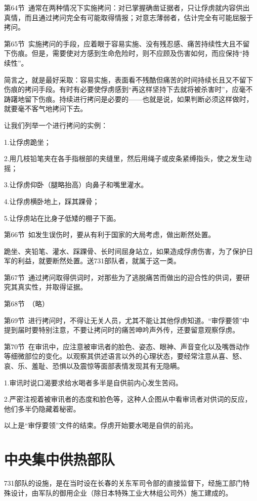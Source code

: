 \documentclass[a4paper,12pt,UTF8,twoside]{ctexbook}
\begin{document}
第64节\ 通常在两种情况下实施拷问：对已掌握确凿证据者，只让俘虏就内容供出真情，而且通过拷问完全有可能取得情报；对意志薄弱者，估计完全有可能屈服于拷问。

第65节\ 实施拷问的手段，应着眼于容易实施、没有残忍感、痛苦持续性大且不留下伤痕。但是，需要使对方感到生命危险时，则不应顾及伤害如何，而应保持“持续性”。

简言之，就是最好采取：容易实施，表面看不残酷但痛苦的时间持续长且又不留下伤痕的拷问手段。有时有必要使俘虏感到“再这样坚持下去就将被杀害时”，应毫不踌躇地留下伤痕。持续进行拷问是必要的——也就是说，如果判断必须这样做时，就要毫不客气地拷问下去。

让我们列举一个进行拷问的实例：

1.让俘虏跪坐；

2.用几枝铅笔夹在各手指根部的夹缝里，然后用绳子或皮条紧缚指头，使之发生动摇；

3.让俘虏仰卧（腿略抬高）向鼻子和嘴里灌水。

4.让俘虏横卧地上，踩其踝骨；

5.让俘虏站在比身子低矮的棚子下面。

第66节\ 如发生误伤时，要从有利于国家的大局考虑，做出断然处置。

跪坐、夹铅笔、灌水、踩踝骨、长时间屈身站立，如果造成俘虏伤害，为了保护日军的利益，就要断然处置。送731部队者，就属于这一类。

第67节\ 通过拷问取得供词时，对那些为了逃脱痛苦而做出的迎合性的供词，要研究其真实性，并取得证据。

第68节\ （略）

第69节\ 进行拷问时，不得让无关人员，尤其不能让其他俘虏知道。“审俘要领”中提到届时要特别注意，不要让拷问时的痛苦呻吟声外传，还要留意观察俘虏。

第70节\ 在审讯中，应注意被审讯者的脸色、姿态、眼神、声音变化以及嘴唇动作等细微部位的变化。以观察其供述语言以外的心理状态，要经常注意从喜、怒、哀、乐、羞耻、恐惧以及震惊等面部表情发现其有无隐瞒。

1.审讯时说口渴要求给水喝者多半是自供前内心发生苦闷。

2.严密注视着被审讯者的态度和脸色等，这种人企图从中看审讯者对供词的反应，他们多半仍隐藏着秘密。

以上是“审俘要领”文件的结束。俘虏开始要水喝是自供的前兆。

\section{中央集中供热部队}

731部队的设施，是在当时设在长春的关东军司令部的直接监督下，经施工部门特殊设计，由军队的御用企业（除日本特殊工业大林组公司外）施工建成的。
\end{document}
